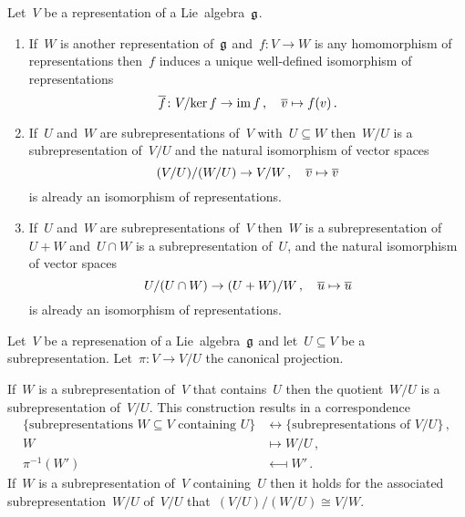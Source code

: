 \begin{corollary}
  Let~$V$ be a representation of a Lie~algebra~$\mathfrak{g}$.
  \begin{enumerate}
    \item
      If~$W$ is another representation of~$\mathfrak{g}$ and~$f \colon V \to W$ is any homomorphism of representations then~$f$ induces a unique well-defined isomorphism of representations
      \[
        \overline{f}
        \colon
        V/{\ker f}
        \to
        \operatorname{im} f \,,
        \quad
        \overline{v}
        \mapsto
        f(v)  \,.
      \]
    \item
      If~$U$ and~$W$ are subrepresentations of~$V$ with~$U \subseteq W$ then~$W/U$ is a subrepresentation of~$V/U$ and the natural isomorphism of vector spaces
      \[
        (V/U) / (W/U)
        \to
        V/W \,,
        \quad
        \overline{v}
        \mapsto
        \overline{v}
      \]
      is already an isomorphism of representations.
    \item
      If~$U$ and~$W$ are subrepresentations of~$V$ then~$W$ is a subrepresentation of~$U+W$ and~$U \cap W$ is a subrepresentation of~$U$, and the natural isomorphism of vector spaces
      \[
        U/(U \cap W)
        \to
        (U + W)/W  \,,
        \quad
        \overline{u}
        \mapsto
        \overline{u}
      \]
      is already an isomorphism of representations.
  \end{enumerate}
\end{corollary}


\begin{proposition}
  \label{correspondence theorem!for representations}
  Let~$V$ be a represenation of a Lie~algebra~$\mathfrak{g}$ and let~$U \subseteq V$ be a subrepresentation.
  Let~$\pi \colon V \to V/U$ the canonical projection.
  
  If~$W$ is a subrepresentation of~$V$ that contains~$U$ then the quotient~$W/U$ is a subrepresentation of~$V/U$.
  This construction results in a {\onetoone} correspondence
  \begin{align*}
    \{ \text{subrepresentations~$W \subseteq V$ containing~$U$} \}
    &\longleftrightarrow
    \{ \text{subrepresentations of~$V/U$} \}  \,,
    \\
    W
    &\longmapsto
    W/U \,,
    \\
    \pi^{-1}(W')
    &\longmapsfrom
    W'  \,.
  \end{align*}
  If~$W$ is a subrepresentation of~$V$ containing~$U$ then it holds for the associated subrepresentation~$W/U$ of~$V/U$ that~$(V/U)/(W/U) \cong V/W$.
\end{proposition}





